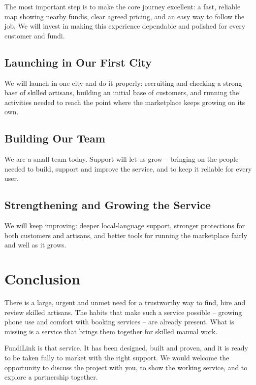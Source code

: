 \documentclass[11pt,a4paper]{article}
\begin{document}
The most important step is to make the core journey excellent: a fast, reliable map showing
nearby fundis, clear agreed pricing, and an easy way to follow the job. We will invest in
making this experience dependable and polished for every customer and fundi.

\subsection{Launching in Our First City}

We will launch in one city and do it properly: recruiting and checking a strong base of
skilled artisans, building an initial base of customers, and running the activities needed to
reach the point where the marketplace keeps growing on its own.

\subsection{Building Our Team}

We are a small team today. Support will let us grow -- bringing on the people needed to build,
support and improve the service, and to keep it reliable for every user.

\subsection{Strengthening and Growing the Service}

We will keep improving: deeper local-language support, stronger protections for both customers
and artisans, and better tools for running the marketplace fairly and well as it grows.

\section{Conclusion}

There is a large, urgent and unmet need for a trustworthy way to find, hire and review skilled
artisans. The habits that make such a service possible -- growing phone use and comfort with
booking services -- are already present. What is missing is a service that brings them
together for skilled manual work.

FundiLink is that service. It has been designed, built and proven, and it is ready to be taken
fully to market with the right support. We would welcome the opportunity to discuss the
project with you, to show the working service, and to explore a partnership together.
\end{document}
